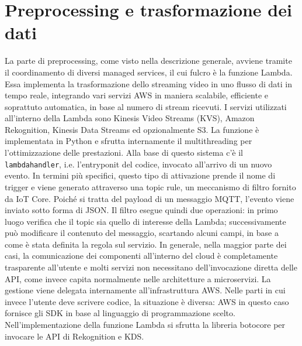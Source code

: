   


 
\section{Preprocessing e trasformazione dei dati}
La parte di preprocessing, come visto nella descrizione generale, avviene tramite il coordinamento di diversi managed services, il cui fulcro è la funzione Lambda. Essa implementa la trasformazione dello streaming video in uno flusso di dati in tempo reale, integrando vari servizi AWS in maniera scalabile, efficiente e soprattuto automatica, in base al numero di stream ricevuti. I servizi utilizzati all'interno della Lambda sono Kinesis Video Streams (KVS), Amazon Rekognition, Kinesis Data Streams ed opzionalmente S3. La funzione è implementata in Python e sfrutta internamente il multithreading per l'ottimizzazione delle prestazioni. Alla base di questo sistema c'è il \texttt{lambda\textunderscore handler}, i.e. l'entryponit del codice, invocato all’arrivo di un nuovo evento. In termini più specifici, questo tipo di attivazione prende il nome di trigger e viene generato attraverso una topic rule, un meccanismo di filtro fornito da IoT Core. Poiché si tratta del payload di un messaggio MQTT, l'evento viene inviato sotto forma di JSON. Il filtro esegue quindi due operazioni: in primo luogo verifica che il topic sia quello di interesse della Lambda; successivamente può modificare il contenuto del messaggio, scartando alcuni campi, in base a come è stata definita la regola sul servizio. In generale, nella maggior parte dei casi, la comunicazione dei componenti all'interno del cloud è completamente trasparente all'utente e molti servizi non necessitano dell'invocazione diretta delle API, come invece capita normalmente nelle architetture a microservizi. La gestione viene delegata internamente all'infrastruttura AWS. Nelle parti in cui invece l'utente deve scrivere codice, la situazione è diversa: AWS in questo caso fornisce gli SDK in base al linguaggio di programmazione scelto. Nell'implementazione della funzione Lambda si sfrutta la libreria botocore per invocare le API di Rekognition e KDS.

